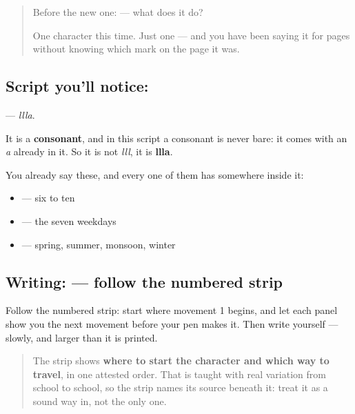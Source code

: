 \label{lesson:ML-S118-letter-llla}



\begin{quote}
Before the new one:  — what does it do?

One character this time. Just one — and you have been saying it for pages without knowing which mark on the page it was.
\end{quote}

\subsection*{Script you'll notice: }
\textbf{} — \emph{llla}.

It is a \textbf{consonant}, and in this script a consonant is never bare: it comes with an \emph{a} already in it. So it is not \emph{lll}, it is \textbf{llla}.

You already say these, and every one of them has  somewhere inside it:

\begin{itemize}
\raggedright
  \item \textbf{    } — six to ten
  \item \textbf{      } — the seven weekdays
  \item \textbf{   } — spring, summer, monsoon, winter
\end{itemize}

\subsection*{Writing:  — follow the numbered strip}

Follow the numbered strip: start where movement 1 begins, and let each panel show you the next movement before your pen makes it. Then write  yourself — slowly, and larger than it is printed.

\begin{quote}
The strip shows \textbf{where to start the character and which way to travel}, in one attested order. That is taught with real variation from school to school, so the strip names its source beneath it: treat it as a sound way in, not the only one.
\end{quote}

